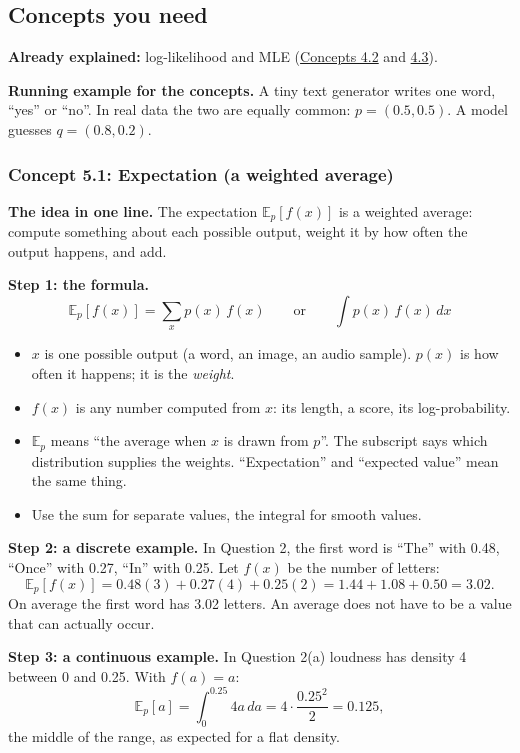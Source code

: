 \documentclass[12pt,a4paper]{article}
\begin{document}
\subsection{Concepts you need}

\textbf{Already explained:} log-likelihood and MLE (\hyperref[c4-2]{Concepts 4.2} and \hyperref[c4-3]{4.3}).

\textbf{Running example for the concepts.} A tiny text generator writes one word, ``yes'' or ``no''. In real data the two are equally common: $p=(0.5,0.5)$. A model guesses $q=(0.8,0.2)$.

\subsubsection{Concept 5.1: Expectation (a weighted average)}\label{c5-1}

\textbf{The idea in one line.} The expectation $\mathbb{E}_p[f(x)]$ is a weighted average: compute something about each possible output, weight it by how often the output happens, and add.

\textbf{Step 1: the formula.}
\[
\mathbb{E}_{p}[f(x)]=\sum_x p(x)\,f(x)\qquad\text{or}\qquad\int p(x)\,f(x)\,dx
\]
\begin{itemize}[nosep]
  \item $x$ is one possible output (a word, an image, an audio sample). $p(x)$ is how often it happens; it is the \emph{weight}.
  \item $f(x)$ is any number computed from $x$: its length, a score, its log-probability.
  \item $\mathbb{E}_p$ means ``the average when $x$ is drawn from $p$''. The subscript says which distribution supplies the weights. ``Expectation'' and ``expected value'' mean the same thing.
  \item Use the sum for separate values, the integral for smooth values.
\end{itemize}

\textbf{Step 2: a discrete example.} In Question 2, the first word is ``The'' with 0.48, ``Once'' with 0.27, ``In'' with 0.25. Let $f(x)$ be the number of letters:
\[
\mathbb{E}_p[f(x)]=0.48(3)+0.27(4)+0.25(2)=1.44+1.08+0.50=3.02 .
\]
On average the first word has 3.02 letters. An average does not have to be a value that can actually occur.

\textbf{Step 3: a continuous example.} In Question 2(a) loudness has density 4 between 0 and 0.25. With $f(a)=a$:
\[
\mathbb{E}_p[a]=\int_0^{0.25}4a\,da=4\cdot\frac{0.25^2}{2}=0.125,
\]
the middle of the range, as expected for a flat density.
\end{document}
